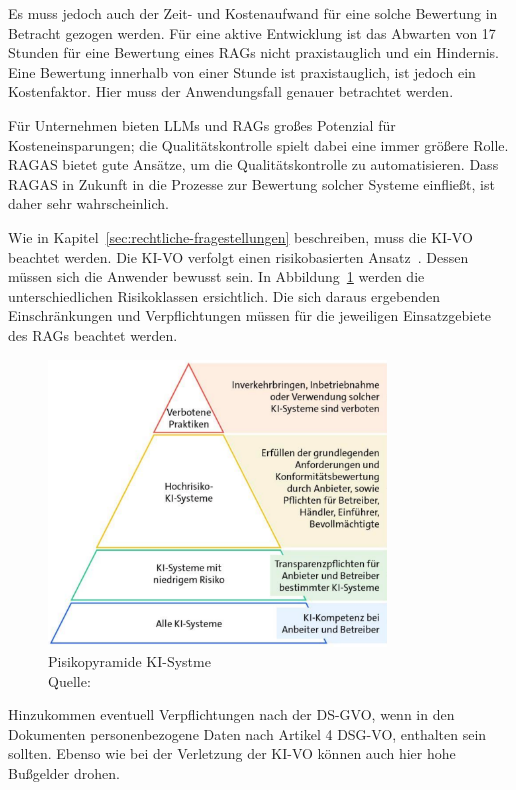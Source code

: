 Es muss jedoch auch der Zeit- und Kostenaufwand für eine solche Bewertung in Betracht gezogen werden.
Für eine aktive Entwicklung ist das Abwarten von 17 Stunden für eine Bewertung eines RAGs nicht praxistauglich und ein Hindernis.
Eine Bewertung innerhalb von einer Stunde ist praxistauglich, ist jedoch ein Kostenfaktor. Hier muss der Anwendungsfall genauer betrachtet werden.

Für Unternehmen bieten LLMs und RAGs großes Potenzial für Kosteneinsparungen; die Qualitätskontrolle spielt dabei eine immer größere Rolle.
RAGAS bietet gute Ansätze, um die Qualitätskontrolle zu automatisieren.
Dass RAGAS in Zukunft in die Prozesse zur Bewertung solcher Systeme einfließt, ist daher sehr wahrscheinlich.

Wie in Kapitel~\ref{sec:rechtliche-fragestellungen} beschreiben, muss die KI-VO beachtet werden.
Die KI-VO verfolgt einen risikobasierten Ansatz~\cite{Ebers2024ChatGPT}.
Dessen müssen sich die Anwender bewusst sein.
In Abbildung~\ref{fig:bitcom_ki_vo_pyramide} werden die unterschiedlichen Risikoklassen ersichtlich.
Die sich daraus ergebenden Einschränkungen und Verpflichtungen müssen für die jeweiligen Einsatzgebiete des RAGs beachtet werden.

\begin{figure}[ht!]
    \centering
    \includegraphics[width=0.8\textwidth]{images/bitcom_ki_vo_pyramide}
    \caption[Pisikopyramide KI-Systme]{Pisikopyramide KI-Systme\\Quelle: \cite{Bitkom2024Umsetzungsleitfaden}}
    \label{fig:bitcom_ki_vo_pyramide}
\end{figure}

Hinzukommen eventuell Verpflichtungen nach der DS-GVO, wenn in den Dokumenten personenbezogene Daten nach Artikel 4 DSG-VO, enthalten sein sollten.
Ebenso wie bei der Verletzung der KI-VO können auch hier hohe Bußgelder drohen.

